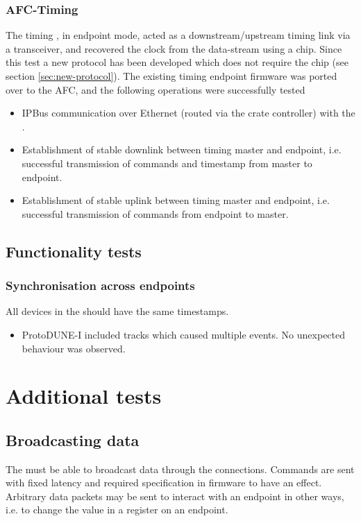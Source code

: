 \documentclass{dune}
\begin{document}
\subsubsection{AFC-Timing }
The timing , in endpoint mode, acted as a downstream/upstream timing link via a  transceiver, and recovered the clock from the data-stream using a  chip.
Since this test a new protocol has been developed which does not require the  chip (see section \ref{sec:new-protocol}).
The existing timing endpoint firmware was ported over to the AFC, and the following operations were successfully tested
\begin{itemize}
    \item IPBus communication over Ethernet (routed via the crate controller) with the  .
    \item Establishment of stable downlink between timing master and endpoint, i.e. successful transmission of commands and timestamp from master to endpoint.
    \item Establishment of stable uplink between timing master and endpoint, i.e. successful transmission of commands from endpoint to master.
\end{itemize}

\subsection{Functionality tests}


\subsubsection{Synchronisation across endpoints}
All devices in the  should have the same timestamps.
\begin{itemize}
  \item ProtoDUNE-I included tracks which caused multiple  events.
    No unexpected behaviour was observed.
\end{itemize}

\section{Additional tests}

\subsection{Broadcasting data}
The  must be able to broadcast data through the  connections.
Commands are sent with fixed latency and required specification in firmware to have an effect.
Arbitrary data packets may be sent to interact with an endpoint in other ways, i.e. to change the value in a register on an endpoint.
\end{document}
